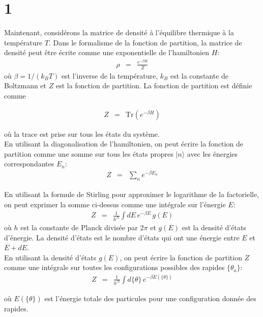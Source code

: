 \section{1}

	Maintenant, considérons la matrice de densité à l'équilibre thermique à la température $T$. Dans le formalisme de la fonction de partition, la matrice de densité peut être écrite comme une exponentielle de l'hamiltonien $H$:
	\begin{eqnarray}
		\rho &= &  \frac{e^{-\beta H}}{Z}	
	\end{eqnarray}
	où $\beta  = 1/(k_B T)$ est l'inverse de la température, $k_B$ est la constante de Boltzmann et $Z$ est la fonction de partition. La fonction de partition est définie comme
	
	\begin{eqnarray}
		Z &= &  \text{Tr}\left (e^{-\beta H} \right )	
	\end{eqnarray}
	
	où la trace est prise sur tous les états du système.\\

	En utilisant la diagonalisation de l'hamiltonien, on peut écrire la fonction de partition comme une somme sur tous les états propres $\vert n \rangle $ avec les énergies correspondantes $E_n$:
	\begin{eqnarray}
		Z &=& \sum_n e^{-\beta E_n}	
	\end{eqnarray}
	
	En utilisant la formule de Stirling pour approximer le logarithme de la factorielle, on peut exprimer la somme ci-dessus comme une intégrale sur l'énergie $E$:
	\begin{eqnarray}
		Z &=& \frac{1}{h^N} \int dE \, e^{-\beta E} \, g(E)	
	\end{eqnarray}
	où $h$ est la constante de Planck divisée par $2\pi$ et $g(E)$ est la densité d'états d'énergie. La densité d'états est le nombre d'états qui ont une énergie entre $E$ et $E+dE$.\\
	
	En utilisant la densité d'états $g(E)$, on peut écrire la fonction de partition $Z$ comme une intégrale sur toutes les configurations possibles des rapides $\{\theta_a\}$:
	\begin{eqnarray}
		Z &=& \frac{1}{h^N} \int d\{\theta\} \, e^{-\beta E(\{\theta\})} 	
	\end{eqnarray}
	
	où $E(\{\theta\})$ est l'énergie totale des particules pour une configuration donnée des rapides.\\
	
